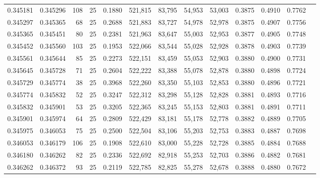 \begin{tabular}{rrrrrrrrrrrrr}
0.345181 & 0.345296 &   108 &  25 &                                     0.1880 & 521,815 &  83,795 &  54,953 &  53,003 & 0.3875 & 0.4910 & 0.7762 \\
0.345297 & 0.345365 &    68 &  25 &                                     0.2688 & 521,883 &  83,727 &  54,978 &  52,978 & 0.3875 & 0.4907 & 0.7756 \\
0.345365 & 0.345451 &    80 &  25 &                                     0.2381 & 521,963 &  83,647 &  55,003 &  52,953 & 0.3877 & 0.4905 & 0.7748 \\
0.345452 & 0.345560 &   103 &  25 &                                     0.1953 & 522,066 &  83,544 &  55,028 &  52,928 & 0.3878 & 0.4903 & 0.7739 \\
0.345561 & 0.345644 &    85 &  25 &                                     0.2273 & 522,151 &  83,459 &  55,053 &  52,903 & 0.3880 & 0.4900 & 0.7731 \\
0.345645 & 0.345728 &    71 &  25 &                                     0.2604 & 522,222 &  83,388 &  55,078 &  52,878 & 0.3880 & 0.4898 & 0.7724 \\
0.345729 & 0.345774 &    38 &  25 &                                     0.3968 & 522,260 &  83,350 &  55,103 &  52,853 & 0.3880 & 0.4896 & 0.7721 \\
0.345774 & 0.345832 &    52 &  25 &                                     0.3247 & 522,312 &  83,298 &  55,128 &  52,828 & 0.3881 & 0.4893 & 0.7716 \\
0.345832 & 0.345901 &    53 &  25 &                                     0.3205 & 522,365 &  83,245 &  55,153 &  52,803 & 0.3881 & 0.4891 & 0.7711 \\
0.345901 & 0.345974 &    64 &  25 &                                     0.2809 & 522,429 &  83,181 &  55,178 &  52,778 & 0.3882 & 0.4889 & 0.7705 \\
0.345975 & 0.346053 &    75 &  25 &                                     0.2500 & 522,504 &  83,106 &  55,203 &  52,753 & 0.3883 & 0.4887 & 0.7698 \\
0.346053 & 0.346179 &   106 &  25 &                                     0.1908 & 522,610 &  83,000 &  55,228 &  52,728 & 0.3885 & 0.4884 & 0.7688 \\
0.346180 & 0.346262 &    82 &  25 &                                     0.2336 & 522,692 &  82,918 &  55,253 &  52,703 & 0.3886 & 0.4882 & 0.7681 \\
0.346262 & 0.346372 &    93 &  25 &                                     0.2119 & 522,785 &  82,825 &  55,278 &  52,678 & 0.3888 & 0.4880 & 0.7672 \\

\end{tabular}
